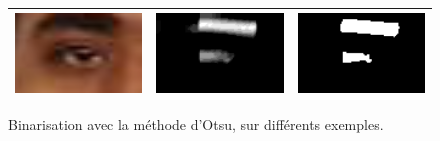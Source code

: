 \begin{figure}[H]
\begin{tabular}{|c|c|c|}
    \hline
    \includegraphics[width=4cm]{image/ssm3/rgb_source.png} & \includegraphics[width=4cm]{image/ssm3/ycbcr_inv_open.png} & \includegraphics[width=4cm]{image/ssm3/ycbcr_bin_open.png} \\
    \hline
  \end{tabular}
  \caption{Binarisation avec la méthode d'Otsu, sur différents exemples.}
\end{figure}

\newpage
